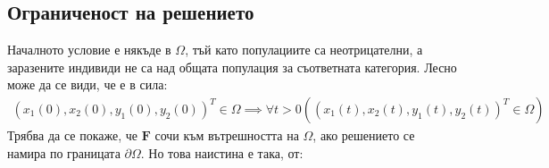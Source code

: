 \subsection{Ограниченост на решението}
Началното условие е някъде в $\Omega$, тъй като популациите са неотрицателни, а заразените индивиди не са над общата популация за съответната категория. Лесно може да се види, че е в сила:
\begin{align}
  (x_1(0), x_2(0), y_1(0), y_2(0))^T \in \Omega \implies \forall{t>0}\left((x_1(t), x_2(t), y_1(t), y_2(t))^T \in \Omega\right)
\end{align}
Трябва да се покаже, че $\mathbf{F}$ сочи към вътрешността на $\Omega$, ако решението се намира по границата $\partial \Omega$. Но това наистина е така, от:

